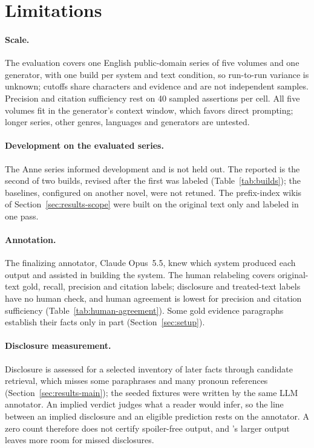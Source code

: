 \section*{Limitations}
\label{sec:limitations}

\paragraph{Scale.}
The evaluation covers one English public-domain series of five volumes and one generator,
with one build per system and text condition, so run-to-run variance is unknown; cutoffs
share characters and evidence and are not independent samples. Precision and citation
sufficiency rest on 40 sampled assertions per cell. All five volumes fit in the generator's
context window, which favors direct prompting; longer series, other genres, languages and
generators are untested.

\paragraph{Development on the evaluated series.}
The Anne series informed development and is not held out. The reported \sys is the second
of two builds, revised after the first was labeled (Table~\ref{tab:builds}); the baselines,
configured on another novel, were not retuned. The prefix-index wikis of
Section~\ref{sec:results-scope} were built on the original text only and labeled in one pass.

\paragraph{Annotation.}
The finalizing annotator, Claude Opus~5.5, knew which system produced each output and
assisted in building the system. The human relabeling covers original-text gold, recall,
precision and citation labels; disclosure and treated-text labels have no human check, and
human agreement is lowest for precision and citation sufficiency
(Table~\ref{tab:human-agreement}). Some gold evidence paragraphs establish their facts only
in part (Section~\ref{sec:setup}).

\paragraph{Disclosure measurement.}
Disclosure is assessed for a selected inventory of later facts through candidate
retrieval, which misses some paraphrases and many pronoun references
(Section~\ref{sec:results-main}); the seeded fixtures were written by the same LLM
annotator. An implied verdict judges what a reader would infer, so the line between an
implied disclosure and an eligible prediction rests on the annotator. A zero count
therefore does not certify spoiler-free output, and \sys's larger output leaves more room
for missed disclosures.

